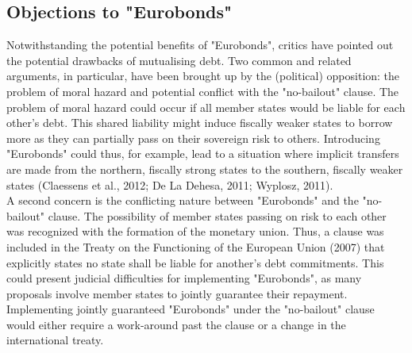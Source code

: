 \subsection{Objections to "Eurobonds"}
Notwithstanding the potential benefits of "Eurobonds", critics have pointed out the potential drawbacks of mutualising debt. Two common and related arguments, in particular, have been brought up by the (political) opposition: the problem of moral hazard and potential conflict with the "no-bailout" clause. The problem of moral hazard could occur if all member states would be liable for each other's debt. This shared liability might induce fiscally weaker states to borrow more as they can partially pass on their sovereign risk to others. Introducing "Eurobonds" could thus, for example, lead to a situation where implicit transfers are made from the northern, fiscally strong states to the southern, fiscally weaker states (Claessens et al., 2012; De La Dehesa, 2011; Wyplosz, 2011).\\

A second concern is the conflicting nature between "Eurobonds" and the "no-bailout" clause. The possibility of member states passing on risk to each other was recognized with the formation of the monetary union. Thus, a clause was included in the Treaty on the Functioning of the European Union (2007) that explicitly states no state shall be liable for another's debt commitments. This could present judicial difficulties for implementing "Eurobonds", as many proposals involve member states to jointly guarantee their repayment. Implementing jointly guaranteed "Eurobonds" under the "no-bailout" clause would either require a work-around past the clause or a change in the international treaty.\\

